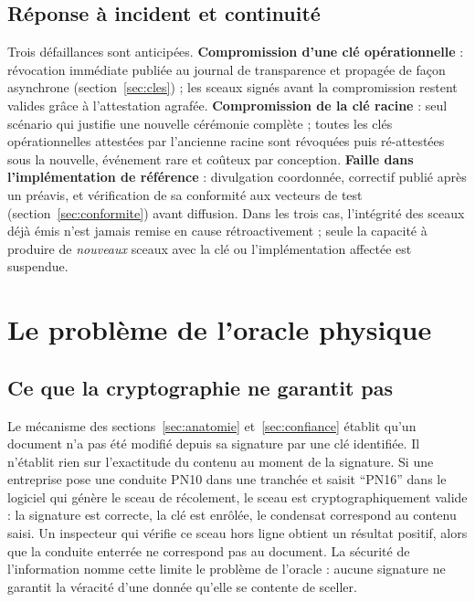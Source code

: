\documentclass[11pt,a4paper]{article}
\begin{document}
\subsection{Réponse à incident et continuité}\label{sec:incident}

Trois défaillances sont anticipées. \textbf{Compromission d'une clé opérationnelle} : révocation immédiate publiée au journal de transparence et propagée de façon asynchrone (section~\ref{sec:cles}) ; les sceaux signés avant la compromission restent valides grâce à l'attestation agrafée. \textbf{Compromission de la clé racine} : seul scénario qui justifie une nouvelle cérémonie complète ; toutes les clés opérationnelles attestées par l'ancienne racine sont révoquées puis ré-attestées sous la nouvelle, événement rare et coûteux par conception. \textbf{Faille dans l'implémentation de référence} : divulgation coordonnée, correctif publié après un préavis, et vérification de sa conformité aux vecteurs de test (section~\ref{sec:conformite}) avant diffusion. Dans les trois cas, l'intégrité des sceaux déjà émis n'est jamais remise en cause rétroactivement ; seule la capacité à produire de \emph{nouveaux} sceaux avec la clé ou l'implémentation affectée est suspendue.

\section{Le problème de l'oracle physique}\label{sec:oracle}

\subsection{Ce que la cryptographie ne garantit pas}

Le mécanisme des sections~\ref{sec:anatomie} et~\ref{sec:confiance} établit qu'un document n'a pas été modifié depuis sa signature par une clé identifiée. Il n'établit rien sur l'exactitude du contenu au moment de la signature. Si une entreprise pose une conduite PN10 dans une tranchée et saisit \enquote{PN16} dans le logiciel qui génère le sceau de récolement, le sceau est cryptographiquement valide : la signature est correcte, la clé est enrôlée, le condensat correspond au contenu saisi. Un inspecteur qui vérifie ce sceau hors ligne obtient un résultat positif, alors que la conduite enterrée ne correspond pas au document. La sécurité de l'information nomme cette limite le problème de l'oracle : aucune signature ne garantit la véracité d'une donnée qu'elle se contente de sceller.
\end{document}
